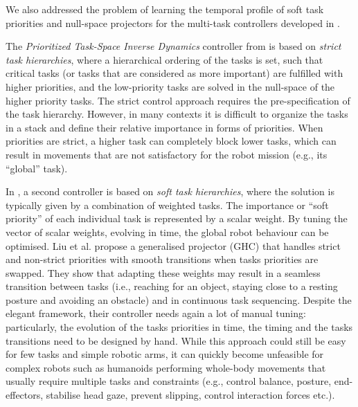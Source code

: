 \documentclass[final,5p,twocolumn]{elsarticle}
\begin{document}
We also addressed the problem of learning the temporal profile of soft
task priorities and null-space projectors for the multi-task controllers
developed in \cite{liu2015}.

The \textit{Prioritized Task-Space Inverse Dynamics} controller from \cite{DelPrete-2014-ID267}
is based on \textit{strict task hierarchies}, where a hierarchical ordering of
the tasks is set, such that critical tasks (or tasks that are considered as more
important) are fulfilled with higher priorities, and the low-priority tasks are
solved in the null-space of the higher priority tasks. The strict control approach requires the
pre-specification of the task hierarchy. However, in many contexts it is
difficult to organize the tasks in a stack and define their relative importance
in forms of priorities. When priorities are strict, a higher task can completely
block lower tasks, which can result in movements that are not satisfactory for
the robot mission (e.g., its ``global'' task). 

In \cite{Salini-2011-ID348}, a second controller is based on \textit{soft task hierarchies}, where
the solution is typically given by a combination of weighted tasks. The importance or ``soft priority'' of each individual
task is represented by a scalar weight. By tuning the vector of scalar weights,
evolving in time, the global robot behaviour can be optimised. Liu et
al. \cite{liu2015} propose a generalised projector (GHC) that handles
strict and non-strict priorities with smooth transitions when tasks priorities
are swapped. They show that adapting these weights may result in a seamless
transition between tasks (i.e., reaching for an object, staying close to a
resting posture and avoiding an obstacle) and in continuous task sequencing.
Despite the elegant framework, their controller needs again a lot of manual
tuning: particularly, the evolution of the tasks priorities in time, the timing
and the tasks transitions need to be designed by hand. While this approach could
still be easy for few tasks and simple robotic arms, it can quickly become
unfeasible for complex robots such as humanoids performing whole-body movements
that usually require multiple tasks and constraints (e.g., control balance,
posture, end-effectors, stabilise head gaze, prevent slipping, control
interaction forces etc.).
\end{document}
